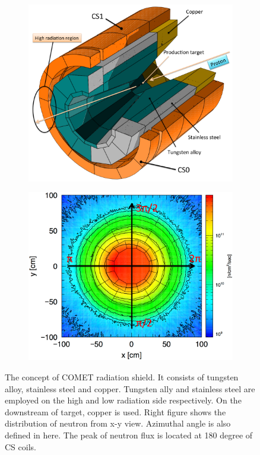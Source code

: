  \begin{figure}[H]
  \begin{subfigure}{0.3\textwidth}
   \centering
   \includegraphics[scale=0.3]{chapter3/fig/shielding.pdf}
  \end{subfigure}
  \hspace{0.2\textwidth}
  \begin{subfigure}{0.3\textwidth}
   \centering
   \includegraphics[scale=0.3]{chapter3/fig/shieldflux.pdf}
  \end{subfigure}
  \caption{The concept of COMET radiation shield. It consists of tungsten alloy, stainless steel and copper. Tungsten ally and stainless steel are employed on the high and low radiation side respectively. On the downstream of target, copper is used. Right figure shows the distribution of neutron from x-y view. Azimuthal angle is also defined in here. The peak of neutron flux is located at 180 degree of CS coils.}
  \label{2shieldgeo}
 \end{figure}

